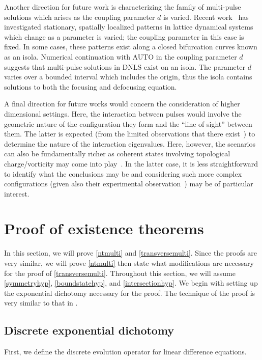\documentclass[12pt]{elsarticle}
\begin{document}
Another direction for future work is characterizing the family of multi-pulse solutions which arises as the coupling parameter $d$ is varied. Recent work~\cite{Jason2019} has investigated stationary, spatially localized patterns in lattice dynamical systems which change as a parameter is varied; the coupling parameter in this case is fixed. In some cases, these patterns exist along a closed bifurcation curves known as an isola. Numerical continuation with AUTO in the coupling parameter $d$ suggests that multi-pulse solutions in DNLS exist on an isola. The parameter $d$ varies over a bounded interval which includes the origin, thus the isola contains solutions to both the focusing and defocusing equation.

A final direction for future works
would concern the consideration of higher dimensional
settings. Here, the interaction between pulses 
would involve the geometric nature of the configuration
they form and the ``line of sight'' between them.
The latter is expected (from the limited observations that
there exist~\cite{alanold}) to determine the nature
of the interaction eigenvalues. Here, however, the
scenarios can also be fundamentally richer as 
coherent states involving topological charge/vorticity
may come into play~\cite{Kevrekidis2009}. In the latter
case, it is less straightforward to identify what the
conclusions may be and considering such more complex
configurations (given also their experimental
observation~\cite{vo3a,vo3b}) may be of particular 
interest.

\section{Proof of existence theorems}

In this section, we will prove \cref{ntmulti} and \cref{transversemulti}. Since the proofs are very similar, we will prove \cref{ntmulti} then state what modifications are necessary for the proof of \cref{transversemulti}. Throughout this section, we will assume \cref{symmetryhyp}, \cref{boundstatehyp}, and \cref{intersectionhyp}. We begin with setting up the exponential dichotomy necessary for the proof. The technique of the proof is very similar to that in \cite{Sandstede1997}.

\subsection{Discrete exponential dichotomy}

First, we define the discrete evolution operator for linear difference equations.
\end{document}
